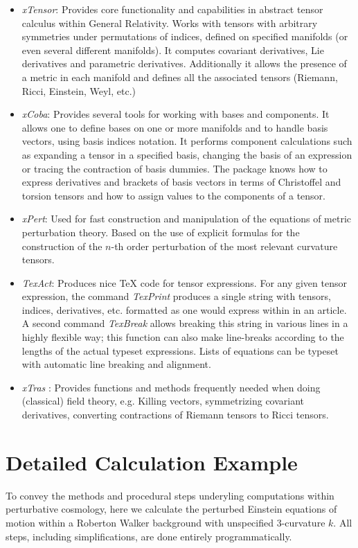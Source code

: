 \begin{itemize}
	\item \textit{xTensor}: Provides core functionality and capabilities in abstract tensor calculus within General Relativity. Works with tensors with arbitrary symmetries under permutations of indices, defined on specified manifolds (or even several different manifolds). It computes covariant derivatives, Lie derivatives and parametric derivatives. Additionally it allows the presence of a metric in each manifold and defines all the associated tensors (Riemann, Ricci, Einstein, Weyl, etc.)
	\item \textit{xCoba}: Provides several tools for working with bases and components. It allows one to define bases on one or more manifolds and to handle basis vectors, using basis indices notation. It performs component calculations such as expanding a tensor in a specified basis, changing the basis of an expression or tracing the contraction of basis dummies. The package knows how to express derivatives and brackets of basis vectors in terms of Christoffel and torsion tensors and how to assign values to the components of a tensor.
	\item \textit{xPert}: Used for fast construction and manipulation of the equations of metric perturbation theory. Based on the use of explicit formulas for the construction of the $n$-th order perturbation of the most relevant curvature tensors.
	\item \textit{TexAct}: Produces nice TeX code for tensor expressions. For any given tensor expression, the command \textit{TexPrint} produces a single string with tensors, indices, derivatives, etc. formatted as one would express within in an article. A second command \textit{TexBreak} allows breaking this string in various lines in a highly flexible way; this function can also make line-breaks according to the lengths of the actual typeset expressions. Lists of equations can be typeset with automatic line breaking and alignment.
	\item \textit{xTras} \cite{nutma_2014}: Provides functions and methods frequently needed when doing (classical) field theory, e.g. Killing vectors, symmetrizing covariant derivatives, converting contractions of Riemann tensors to Ricci tensors.
\end{itemize}



\section{Detailed Calculation Example}
\label{s:calc_example}
To convey the methods and procedural steps underyling computations within perturbative cosmology, here we calculate the perturbed Einstein equations of motion within a Roberton Walker background with unspecified 3-curvature $k$. All steps, including simplifications, are done entirely programmatically. 

